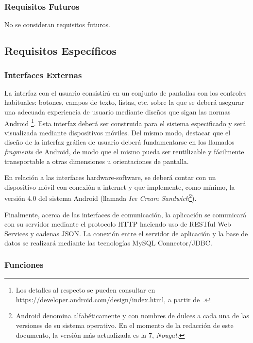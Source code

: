 \subsubsection{Requisitos Futuros}

No se consideran requisitos futuros.

\subsection{Requisitos Específicos}

\subsubsection{Interfaces Externas}

La interfaz con el usuario consistirá en un conjunto de pantallas con los controles habituales: botones, campos de texto, listas, etc. sobre la que se deberá asegurar una adecuada experiencia de usuario mediante diseños que sigan las normas Android \footnote{Los detalles al respecto se pueden consultar en \url{https://developer.android.com/design/index.html}, a partir de~\cite{AnDev}.}. Esta interfaz deberá ser construida para el sistema especificado y será visualizada mediante dispositivos móviles. Del mismo modo, destacar que el diseño de la interfaz gráfica de usuario deberá fundamentarse en los llamados \emph{fragments} de Android, de modo que el mismo pueda ser reutilizable y fácilmente transportable a otras dimensiones u orientaciones de pantalla.

En relación a las interfaces hardware-software, se deberá contar con un dispositivo móvil con conexión a internet y que implemente, como mínimo, la versión 4.0 del sistema Android (llamada \emph{Ice Cream Sandwich}\footnote{Android denomina alfabéticamente y con nombres de dulces a cada una de las versiones de su sistema operativo. En el momento de la redacción de este documento, la versión más actualizada es la 7, \textit{Nougat}.}).

Finalmente, acerca de las interfaces de comunicación, la aplicación se comunicará con su servidor mediante el protocolo HTTP haciendo uso de RESTful Web Services y cadenas JSON. La conexión entre el servidor de aplicación y la base de datos se realizará mediante las tecnologías MySQL Connector/JDBC.
\subsubsection{Funciones}

